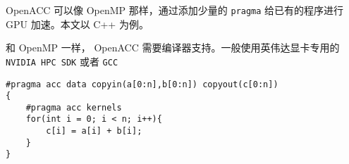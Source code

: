 
\begin{issues}
\issueDraft
\end{issues}

OpenACC 可以像 OpenMP 那样，通过添加少量的 \verb`pragma` 给已有的程序进行 GPU 加速。本文以 C++ 为例。

和 OpenMP 一样， OpenACC 需要编译器支持。一般使用英伟达显卡专用的 \verb`NVIDIA HPC SDK` 或者 \verb`GCC`

\begin{lstlisting}[language=none]
#pragma acc data copyin(a[0:n],b[0:n]) copyout(c[0:n])
{
    #pragma acc kernels 
    for(int i = 0; i < n; i++){
        c[i] = a[i] + b[i];
    }
}
\end{lstlisting}
